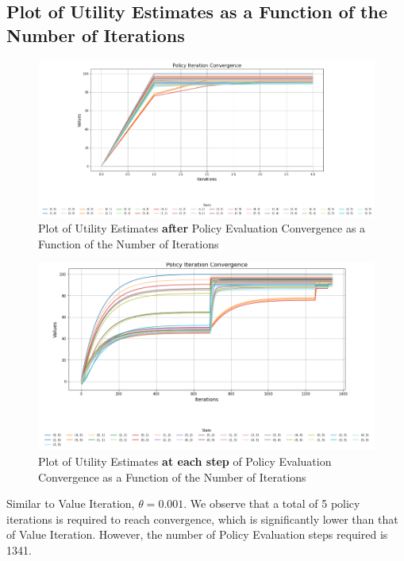 \subsection{Plot of Utility Estimates as a Function of the Number of Iterations}

\begin{figure}[H]
    \centering
    \includegraphics[width=1.0\textwidth, height=0.3\textheight]{images/pi_iteration.png}
    \caption{Plot of Utility Estimates \textbf{after} Policy Evaluation Convergence as a Function of the Number of Iterations}
    \label{fig:pi_plot_utility_iteration}
\end{figure}

\begin{figure}[H]
    \centering
    \includegraphics[width=1.0\textwidth]{images/pi_each_step.png}
    \caption{Plot of Utility Estimates \textbf{at each step} of Policy Evaluation Convergence as a Function of the Number of Iterations}
    \label{fig:pi_plot_utility_each_step}
\end{figure}

\noindent Similar to Value Iteration, $\theta = 0.001$. We observe that a total of 5 policy iterations is required to reach convergence, which is significantly lower than that of Value Iteration. However, the number of Policy Evaluation steps required is 1341. \vspace{10pt}


